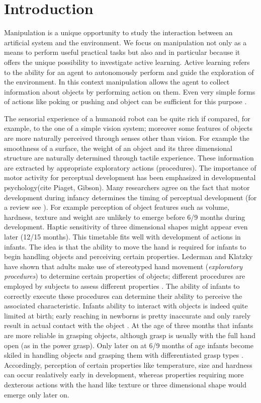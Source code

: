 \section{Introduction}
Manipulation is a unique opportunity to study the interaction between an artificial system and the environment. We focus on manipulation not only as a means to perform useful practical tasks but also and in particular because it offers the unique possibility to investigate active learning. Active learning refers to the ability for an agent to autonomously perform and guide the exploration of the environment. In this context manipulation allows the agent to collect information about objects by performing action on them. Even very simple forms of actions like poking or pushing and object can be sufficient for this purpose \cite{fitzpatrick03learning}.

The sensorial experience of a humanoid robot can be quite rich if compared, for example, to the one of a simple vision system; moreover some features of objects are more naturally perceived through senses other than vision. For example the smoothness of a surface, the weight of an object and its three dimensional structure are naturally determined through tactile experience. These information are extracted by appropriate exploratory actions (procedures).
The importance of motor activity for perceptual development has been emphasized in developmental psychology(cite Piaget, Gibson). Many researchers agree on the fact that motor development during infancy determines the timing of perceptual development (for a review see \cite{bushnell93motor}). For example perception of object features such as volume, hardness, texture and weight are unlikely to emerge before 6/9 months during development. Haptic sensitivity of three dimensional shapes might appear even later (12/15 months). This timetable fits well with development of actions in infants. The idea is that the ability to move the hand is required for infants to begin handling objects and perceiving certain properties. Lederman and Klatzky have shown that adults make use of stereotyped hand movement (\emph{exploratory procedures}) to determine certain properties of objects; different procedures are employed by subjects to assess different properties \cite{lederman87hand}. The ability of infants to correctly execute these procedures can determine their ability to perceive the associated characteristic. Infants ability to interact with objects is indeed quite limited at birth; early reaching in newborns is pretty inaccurate and only rarely result in actual contact with the object \cite{hofsten82eye-hand}. At the age of three months that infants are more reliable in grasping objects, although grasp is usually with the full hand open (as in the power grasp). Only later on at 6/9 months of age infants become skiled in handling objects and grasping them with differentiated grasp types \cite{hofsten93thestructuring}. Accordingly, perception of certain properties like temperature, size and hardness can occur realatively early in development, whereas properties requiring more dexterous actions with the hand like texture or three dimensional shape would emerge only later on.

